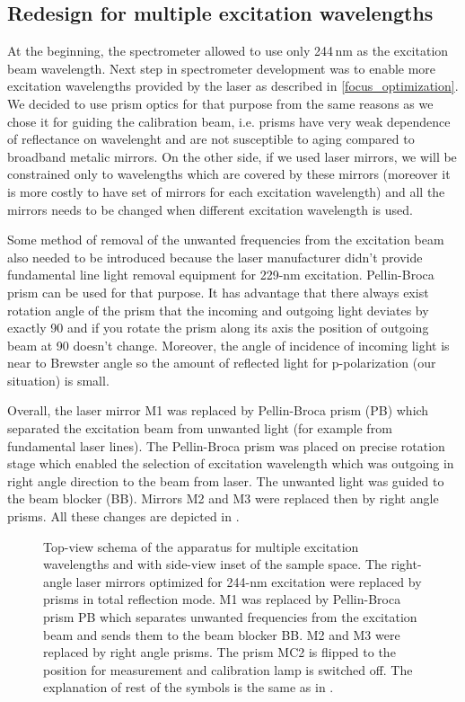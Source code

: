 \subsection{Redesign for multiple excitation wavelengths}

At the beginning, the spectrometer allowed to use only 244\,nm as the
excitation beam wavelength. Next step in spectrometer development was to
enable more excitation wavelengths provided by the laser as described in
\cref{focus_optimization}.
We decided to use prism optics for that purpose from the same reasons as we
chose it for guiding the calibration beam, i.e. prisms have very weak
dependence of reflectance on wavelenght and are not susceptible to aging
compared to broadband metalic mirrors. On the other side, if we used laser
mirrors, we will be constrained only to wavelengths which are covered by
these mirrors (moreover it is more costly to have set of mirrors for each
excitation wavelength) and all the mirrors needs to be changed when different
excitation wavelength is used.

Some method of removal of the unwanted frequencies from the excitation beam
also needed to be introduced because the laser manufacturer didn't provide
fundamental line light removal equipment for 229-nm excitation. Pellin-Broca
prism can be used for that purpose. It has advantage that there always exist
rotation angle of the prism that the incoming and outgoing light deviates by
exactly 90\textdegree{} and if you rotate the prism along its axis the position
of outgoing beam at 90\textdegree{} doesn't change. Moreover, the angle of
incidence of incoming light is near to Brewster angle so the amount of
reflected light for p-polarization (our situation) is small.

Overall, the laser mirror M1 was replaced by Pellin-Broca prism (PB) which
separated the excitation beam from unwanted light (for example from fundamental
laser lines). The Pellin-Broca prism was placed on precise rotation stage
which enabled the selection of excitation wavelength which was outgoing in
right angle direction to the beam from laser. The unwanted light was guided to
the beam blocker (BB). Mirrors M2 and M3 were replaced then by right angle
prisms. All these changes are depicted in
.

\begin{figure}
	\centering
	
	\caption{Top-view schema of the apparatus for multiple excitation wavelengths
		and with side-view inset of the sample space. The right-angle laser
		mirrors optimized for 244-nm excitation were replaced by prisms in total
		reflection mode. M1 was replaced by Pellin-Broca prism PB which separates
		unwanted frequencies from the excitation beam and sends them to the beam
		blocker BB. M2 and M3 were replaced by right angle prisms. The prism MC2 is
		flipped to the position for measurement and calibration lamp is switched
		off. The explanation of rest of the symbols is the same as in
		.}
	\label{\figlabel{multiple_excitations:apparatus_schema}}
\end{figure}

